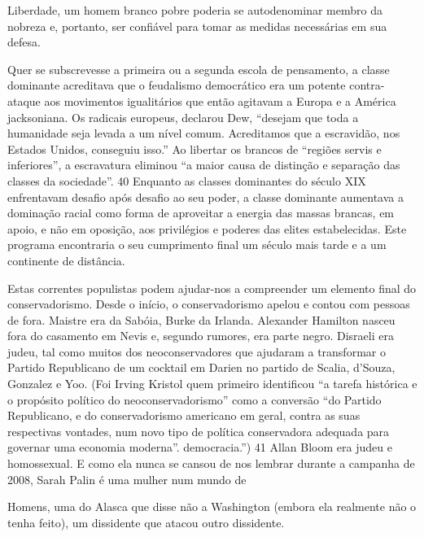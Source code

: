  \par 
Liberdade, um homem branco pobre poderia se autodenominar membro da nobreza e, portanto, ser confiável para tomar as medidas necessárias em sua defesa.
 \par 
Quer se subscrevesse a primeira ou a segunda escola de pensamento, a classe dominante acreditava que o feudalismo democrático era um potente contra-ataque aos movimentos igualitários que então agitavam a Europa e a América jacksoniana. Os radicais europeus, declarou Dew, “desejam que toda a humanidade seja levada a um nível comum. Acreditamos que a escravidão, nos Estados Unidos, conseguiu isso.” Ao libertar os brancos de “regiões servis e inferiores”, a escravatura eliminou “a maior causa de distinção e separação das classes da sociedade”. {\color{blue}40} Enquanto as classes dominantes do século XIX enfrentavam desafio após desafio ao seu poder, a classe dominante aumentava a dominação racial como forma de aproveitar a energia das massas brancas, em apoio, e não em oposição, aos privilégios e poderes das elites estabelecidas. Este programa encontraria o seu cumprimento final um século mais tarde e a um continente de distância.
 \par 
Estas correntes populistas podem ajudar-nos a compreender um elemento final do conservadorismo. Desde o início, o conservadorismo apelou e contou com pessoas de fora. Maistre era da Sabóia, Burke da Irlanda. Alexander Hamilton nasceu fora do casamento em Nevis e, segundo rumores, era parte negro. Disraeli era judeu, tal como muitos dos neoconservadores que ajudaram a transformar o Partido Republicano de um cocktail em Darien no partido de Scalia, d’Souza, Gonzalez e Yoo. (Foi Irving Kristol quem primeiro identificou “a tarefa histórica e o propósito político do neoconservadorismo” como a conversão “do Partido Republicano, e do conservadorismo americano em geral, contra as suas respectivas vontades, num novo tipo de política conservadora adequada para governar uma economia moderna”. democracia.”) {\color{blue}41} Allan Bloom era judeu e homossexual. E como ela nunca se cansou de nos lembrar durante a campanha de 2008, Sarah Palin é uma mulher num mundo de
 \par 
Homens, uma do Alasca que disse não a Washington (embora ela realmente não o tenha feito), um dissidente que atacou outro dissidente.
 \par 

